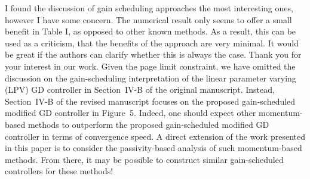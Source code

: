 \begin{rebuttal}
    {%
        I found the discussion of gain scheduling approaches the most interesting ones, however I have some concern. The numerical result only seems to offer a small benefit in Table I, as opposed to other known methods. As a result, this can be used as a criticism, that the benefits of the approach are very minimal. It would be great if the authors can clarify whether this is always the case.
    }%
    {%
        Thank you for your interest in our work. Given the page limit constraint, we have omitted the discussion on the gain-scheduling interpretation of the linear parameter varying (LPV) GD controller in \mbox{Section~IV-B} of the original manuscript. Instead, Section~IV-B of the revised manuscript focuses on the proposed gain-scheduled modified GD controller in Figure~5. Indeed, one should expect other momentum-based methods to outperform the proposed gain-scheduled modified GD controller in terms of convergence speed. A direct extension of the work presented in this paper is to consider the passivity-based analysis of such momentum-based methods. From there, it may be possible to construct similar gain-scheduled controllers for these methods!
    }%
\end{rebuttal}
